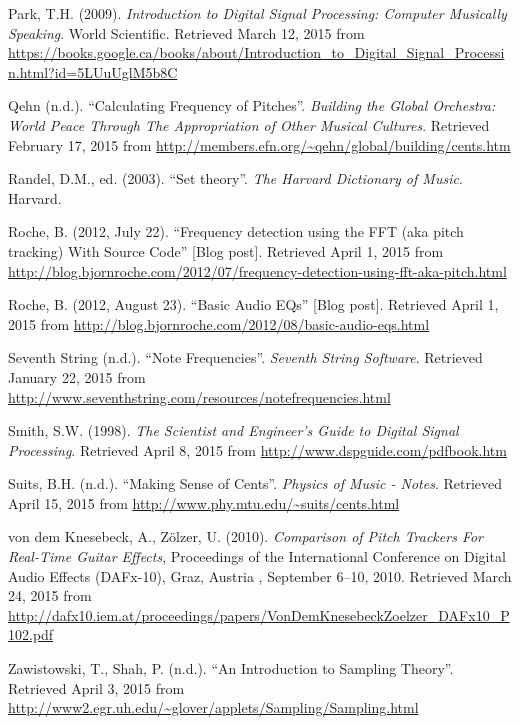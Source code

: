 \documentclass[12pt]{report}
\begin{document}
\begin{thebibliography}{100}
	 Park, T.H. (2009). \emph{Introduction to Digital Signal Processing: Computer Musically Speaking}. World Scientific. Retrieved March 12, 2015 from \url{https://books.google.ca/books/about/Introduction_to_Digital_Signal_Processin.html?id=5LUuUglM5b8C}
	
	 Qehn (n.d.). ``Calculating Frequency of Pitches''. \emph{Building the Global Orchestra: World Peace Through The Appropriation of Other Musical Cultures}. Retrieved February 17, 2015 from \url{http://members.efn.org/~qehn/global/building/cents.htm}
	
	 Randel, D.M., ed. (2003). ``Set theory''. \emph{The Harvard Dictionary of Music}. Harvard.

	 Roche, B. (2012, July 22). ``Frequency detection using the FFT (aka pitch tracking) With Source Code'' [Blog post]. Retrieved April 1, 2015 from \url{http://blog.bjornroche.com/2012/07/frequency-detection-using-fft-aka-pitch.html}
	
	 Roche, B. (2012, August 23). ``Basic Audio EQs'' [Blog post]. Retrieved April 1, 2015 from \url{http://blog.bjornroche.com/2012/08/basic-audio-eqs.html}
	
	 Seventh String (n.d.). ``Note Frequencies''. \emph{Seventh String Software}. Retrieved January 22, 2015 from \url{http://www.seventhstring.com/resources/notefrequencies.html}
	
	 Smith, S.W. (1998). \emph{The Scientist and Engineer's Guide to Digital Signal Processing}. Retrieved April 8, 2015 from \url{http://www.dspguide.com/pdfbook.htm}
	
	 Suits, B.H. (n.d.). ``Making Sense of Cents''. \emph{Physics of Music - Notes}. Retrieved April 15, 2015 from \url{http://www.phy.mtu.edu/~suits/cents.html}
	
	 von dem Knesebeck, A., Z{\"o}lzer, U. (2010). \emph{Comparison of Pitch Trackers For Real-Time Guitar Effects}, Proceedings of the  International Conference on Digital Audio Effects (DAFx-10), Graz, Austria , September 6--10, 2010. Retrieved March 24, 2015 from \url{http://dafx10.iem.at/proceedings/papers/VonDemKnesebeckZoelzer_DAFx10_P102.pdf}

	  Zawistowski, T., Shah, P. (n.d.). ``An Introduction to Sampling Theory''. Retrieved April 3, 2015 from \url{http://www2.egr.uh.edu/~glover/applets/Sampling/Sampling.html}

	\end{thebibliography}
\clearpage
\end{document}

